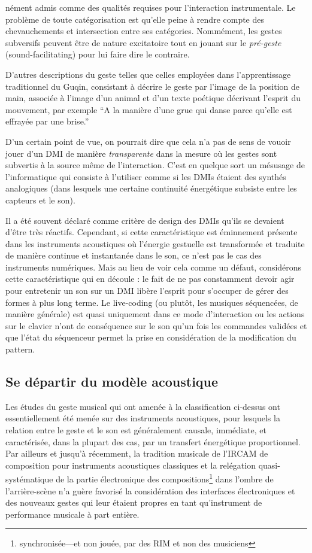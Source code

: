 nément admis comme des qualités requises pour l'interaction instrumentale.
Le problème de toute catégorisation est qu'elle peine à rendre compte des chevauchements et intersection entre ses catégories. Nommément, les gestes subversifs peuvent être de nature excitatoire tout en jouant sur le \textit{pré-geste} (sound-facilitating) pour lui faire dire le contraire.

D'autres descriptions du geste telles que celles employées dans l'apprentissage traditionnel du Guqin, consistant à décrire le geste par l'image de la position de main, associée à l'image d'un animal et d'un texte poétique décrivant l'esprit du mouvement, par exemple ``A la manière d'une grue qui danse parce qu'elle est effrayée par une brise.''

D'un certain point de vue, on pourrait dire que cela n'a pas de sens de vouoir jouer d'un \gls{DMI} de manière \textit{transparente} dans la mesure où les gestes sont subvertis à la source même de l'interaction. C'est en quelque sort un mésusage de l'informatique qui consiste à l'utiliser comme si les \glspl{DMI} étaient des synthés analogiques (dans lesquels une certaine continuité énergétique subsiste entre les capteurs et le son).


Il a été souvent déclaré comme critère de design des DMIs qu'ils se devaient d'être très réactifs. Cependant, si cette caractéristique est éminnement présente dans les instruments acoustiques où l'énergie gestuelle est transformée et traduite de manière continue et instantanée dans le son, ce n'est pas le cas des instruments numériques. Mais au lieu de voir cela comme un défaut, considérons cette caractéristique qui en découle : le fait de ne pas constamment devoir agir pour entretenir un son sur un \gls{DMI} libère l'esprit pour s'occuper de gérer des formes à plus long terme. Le live-coding (ou plutôt, les musiques séquencées, de manière générale) est quasi uniquement dans ce mode d'interaction ou les actions sur le clavier n'ont de conséquence sur le son qu'un fois les commandes validées et que l'état du séquenceur permet la prise en considération de la modification du pattern.

\subsection{Se départir du modèle acoustique}

Les études du geste musical qui ont amenée à la classification ci-dessus ont essentiellement été menée sur des instruments acoustiques, pour lesquels la relation entre le geste et le son est généralement causale, immédiate, et caractérisée, dans la plupart des cas, par un transfert énergétique proportionnel.
Par ailleurs et jusqu'à récemment, la tradition musicale de l'IRCAM de composition pour instruments acoustiques classiques et la relégation quasi-systématique de la partie électronique des compositions\footnote{synchronisée—et non jouée, par des \gls{RIM} et non des musiciens} dans l'ombre de l'arrière-scène n'a guère favorisé la considération des interfaces électroniques et des nouveaux gestes qui leur étaient propres en tant qu'instrument de performance musicale à part entière.

